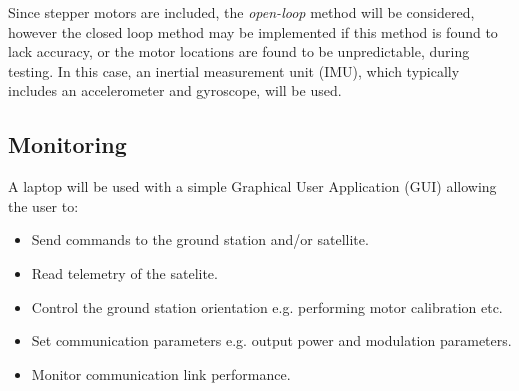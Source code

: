 Since stepper motors are included, the \textit{open-loop} method will be considered, however the closed loop method may be implemented if this method is found to lack accuracy, or the motor locations are found to be unpredictable, during testing. In this case, an inertial measurement unit (IMU), which typically includes an accelerometer and gyroscope, will be used.

\subsection{Monitoring}
A laptop will be used with a simple Graphical User Application (GUI) allowing the user to:
\begin{itemize}
    \item Send commands to the ground station and/or satellite.
    \item Read telemetry of the satelite.
    \item Control the ground station orientation e.g. performing motor calibration etc.
    \item Set communication parameters e.g. output power and modulation parameters.
    \item Monitor communication link performance.
\end{itemize}